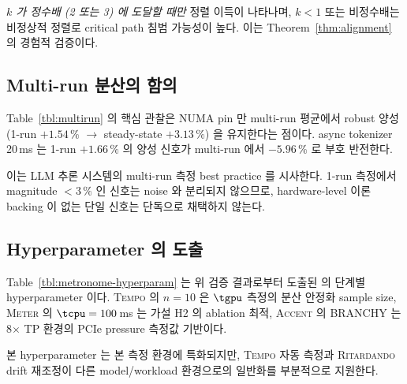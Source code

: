 \emph{$k$ 가 정수배 (2 또는 3) 에 도달할 때만} 정렬 이득이 나타나며, $k < 1$ 또는 비정수배는 비정상적 정렬로 critical path 침범 가능성이 높다.
이는 Theorem~\ref{thm:alignment} 의 경험적 검증이다.

\subsection{Multi-run 분산의 함의}



Table~\ref{tbl:multirun} 의 핵심 관찰은 NUMA pin 만 multi-run 평균에서 robust 양성 (1-run $+1.54\,\%$ $\rightarrow$ steady-state $+3.13\,\%$) 을 유지한다는 점이다.
async tokenizer 20\,ms 는 1-run $+1.66\,\%$ 의 양성 신호가 multi-run 에서 $-5.96\,\%$ 로 부호 반전한다.

이는 LLM 추론 시스템의 multi-run 측정 best practice 를 시사한다.
1-run 측정에서 magnitude $< 3\,\%$ 인 신호는 noise 와 분리되지 않으므로, hardware-level 이론 backing 이 없는 단일 신호는 단독으로 채택하지 않는다.

\subsection{\algname Hyperparameter 의 도출}



Table~\ref{tbl:metronome-hyperparam} 는 위 검증 결과로부터 도출된 \algname 의 단계별 hyperparameter 이다.
\textsc{Tempo} 의 $n=10$ 은 $\tgpu$ 측정의 분산 안정화 sample size, \textsc{Meter} 의 $\tcpu = 100$\,ms 는 가설 H2 의 ablation 최적, \textsc{Accent} 의 BRANCHY 는 8$\times$ TP 환경의 PCIe pressure 측정값 기반이다.

본 hyperparameter 는 본 측정 환경에 특화되지만, \textsc{Tempo} 자동 측정과 \textsc{Ritardando} drift 재조정이 다른 model/workload 환경으로의 일반화를 부분적으로 지원한다.
